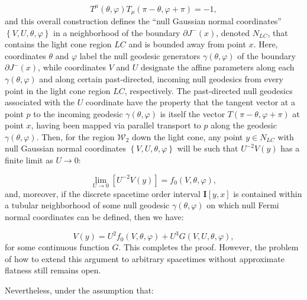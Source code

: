 \documentclass{article}
\begin{document}
\begin{equation}
T^{\mu} \left( \theta, \varphi \right) T_{\mu} \left( \pi - \theta, \varphi + \pi \right) = -1,
\end{equation}
and this overall construction defines the ``null Gaussian normal coordinates'' ${\left\lbrace V, U, \theta, \varphi \right\rbrace}$ in a neighborhood of the boundary ${\partial J^{-} \left( x \right)}$, denoted ${N_{LC}}$, that contains the light cone region ${LC}$ and is bounded away from point $x$. Here, coordinates ${\theta}$ and ${\varphi}$ label the null geodesic generators ${\gamma \left( \theta, \varphi \right)}$ of the boundary ${\partial J^{-} \left( x \right)}$, while coordinates $V$ and $U$ designate the affine parameters along each ${\gamma \left( \theta, \varphi \right)}$ and along certain past-directed, incoming null geodesics from every point in the light cone region ${LC}$, respectively. The past-directed null geodesics associated with the $U$ coordinate have the property that the tangent vector at a point $p$ to the incoming geodesic ${\gamma \left( \theta, \varphi \right)}$ is itself the vector ${T \left( \pi - \theta, \varphi + \pi \right)}$ at point $x$, having been mapped via parallel transport to $p$ along the geodesic ${\gamma \left( \theta, \varphi \right)}$. Then, for the region ${\mathcal{W}_2}$ down the light cone, any point ${y \in N_{LC}}$ with null Gaussian normal coordinates ${\left\lbrace V, U, \theta, \varphi \right\rbrace}$ will be such that ${U^{-2} V \left( y \right)}$ has a finite limit as ${U \to 0}$:

\begin{equation}
\lim_{U \to 0} \left[ U^{-2} V \left( y \right) \right] = f_0 \left( V, \theta, \varphi \right),
\end{equation}
and, moreover, if the discrete spacetime order interval ${\mathbf{I} \left[ y, x \right]}$ is contained within a tubular neighborhood of some null geodesic ${\gamma \left( \theta, \varphi \right)}$ on which null Fermi normal coordinates can be defined, then we have:

\begin{equation}
V \left( y \right) = U^2 f_0 \left( V, \theta, \varphi \right) + U^3 G \left( V, U, \theta, \varphi \right),
\end{equation}
for some continuous function $G$. This completes the proof. However, the problem of how to extend this argument to arbitrary spacetimes without approximate flatness still remains open.

Nevertheless, under the assumption that:
\end{document}
